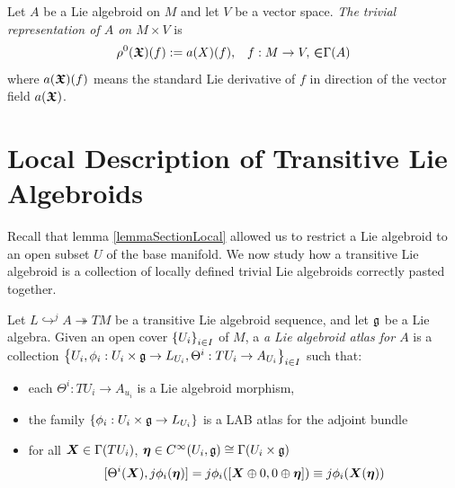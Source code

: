 \begin{definition}
Let $A$ be a Lie algebroid on $M$ and let $V$ be a vector space. \emph{The trivial representation of $A$ on $M \times V$} is
\begin{align*}
    \rho^0(\bm{\mathfrak{X}})(f) := a(X)(f), && f: M \to V,\, \bm{\mathfrak{\in}} \Gamma(A)
\end{align*}
where $a(\bm{\mathfrak{X}})(f)$ means the standard Lie derivative of $f$ in direction of the vector field $a(\bm{\mathfrak{X}})$.
\end{definition}




\section{Local Description of Transitive Lie Algebroids}

Recall that lemma \ref{lemmaSectionLocal} allowed us to restrict a Lie algebroid to an open subset $U$ of the base manifold. We now study how a transitive Lie algebroid is a collection of locally defined trivial Lie algebroids correctly pasted together.

\begin{definition}
Let $L \hookrightarrow^j A \twoheadrightarrow TM$ be a transitive Lie algebroid sequence, and let $\mathfrak{g}$ be a Lie algebra. Given an open cover $\left\{ U_i \right\}_{i \in I}$ of $M$, a \emph{a Lie algebroid atlas for $A$} is a collection $\set{U_i, \phi_i:U_i \times \alg g \to L_{U_i}, \Theta^i: TU_i \to A_{U_i}}_{i \in I}$ such that:
    \begin{itemize}
    
    \item each $\Theta^i: TU_i \to A_{u_i}$ is a Lie algebroid morphism,
    
    \item the family $\set{\phi_i:U_i \times \alg g \to L_{U_i}}$ is a LAB atlas for the adjoint bundle 
    
    \item for all $\bm{X} \in \Gamma(TU_i)$, $\bm{\eta} \in C^\infty(U_i, \mathfrak{g}) \cong \Gamma(U_i \times \mathfrak{g})$
        \begin{align} \label{eqnCompLocal}
            [\Theta^i(\sect X), j\phi_i(\sect \eta)] = j\phi_i([\sect X \oplus 0, 0 \oplus \sect \eta]) \equiv j\phi_i(\sect X(\sect \eta)) 
        \end{align}
    
    \end{itemize}
\end{definition}

